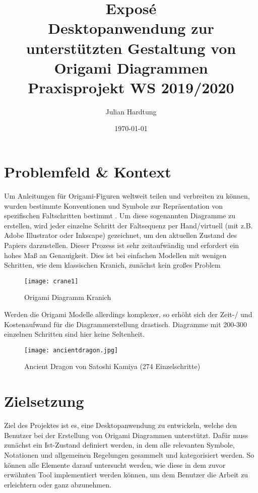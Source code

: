 \documentclass[12pt]{article}
\begin{document}
\title{Exposé\\\huge Desktopanwendung zur unterstützten Gestaltung von Origami Diagrammen\\\large Praxisprojekt WS 2019/2020}
\author{Julian Hardtung}
\date{\today}
\maketitle
\renewcommand{\figurename}{Abb.}
\renewcommand{\tablename}{Tab.}
\section{Problemfeld \& Kontext}

Um Anleitungen für Origami-Figuren weltweit teilen und verbreiten zu können, wurden bestimmte Konventionen und Symbole zur Repräsentation von spezifischen Faltschritten bestimmt \cite{diagramming_conventions}. Um diese sogenannten Diagramme zu erstellen, wird jeder einzelne Schritt der Faltsequenz per Hand/virtuell (mit z.B. Adobe Illustrator oder Inkscape) gezeichnet, um den aktuellen Zustand des Papiers darzustellen. Dieser Prozess ist sehr zeitaufwändig und erfordert ein hohes Maß an Genauigkeit. Dies ist bei einfachen Modellen mit wenigen Schritten, wie dem klassischen Kranich, zunächst kein großes Problem %

\begin{figure}[h]
\centering
\texttt{[image: crane1]}
\caption{Origami Diagramm Kranich}
\label{fig:cranediagram}
\end{figure}

\newpage

Werden die Origami Modelle allerdings komplexer, so erhöht sich der Zeit-/ und Kostenaufwand für die Diagrammerstellung drastisch. Diagramme mit 200-300 einzelnen Schritten sind hier keine Seltenheit.

\begin{figure}[h]
\centering
\texttt{[image: ancientdragon.jpg]}
\caption{Ancient Dragon von Satoshi Kamiya (274 Einzelschritte)}
\label{fig:ancientdragon}
\end{figure}


\section{Zielsetzung}
Ziel des Projektes ist es, eine Desktopanwendung zu entwickeln, welche den Benutzer bei der Erstellung von Origami Diagrammen unterstützt. Dafür muss zunächst ein Ist-Zustand definiert werden, in dem alle relevanten Symbole, Notationen und allgemeinen Regelungen gesammelt und kategorisiert werden. So können alle Elemente darauf untersucht werden, wie diese in dem zuvor erwähnten Tool implementiert werden können, um dem Benutzer die Arbeit zu erleichtern oder ganz abzunehmen.
\end{document}
